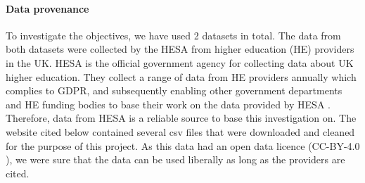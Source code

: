 \documentclass[11pt,a4paper]{article}
\begin{document}
\paragraph{Data provenance} 
To investigate the objectives, we have used 2 datasets in total. The data from both datasets were collected by the HESA from higher education (HE) providers in the UK. HESA is the official government agency for collecting data about UK higher education. They collect a range of data from HE providers annually which complies to GDPR, and subsequently enabling other government departments and HE funding bodies to base their work on the data provided by HESA \cite{Imperial_HESA}. Therefore, data from HESA is a reliable source to base this investigation on. The website cited below contained several csv files that were downloaded and cleaned for the purpose of this project. As this data had an open data licence (CC-BY-4.0 \cite{CreativeCommons}), we were sure that the data can be used liberally as long as the providers are cited. \cite{HESA_Intro}
\end{document}
